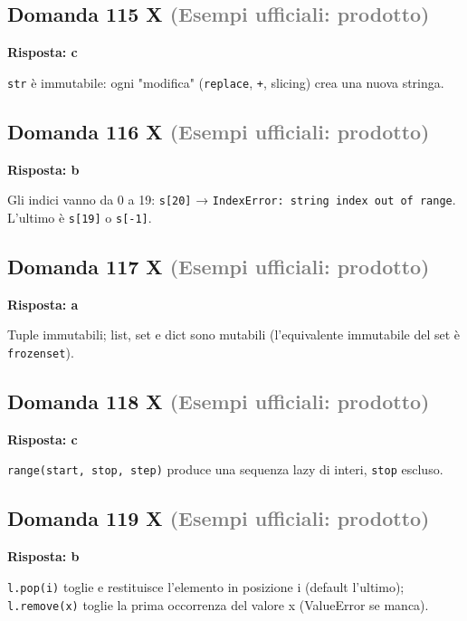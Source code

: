 \documentclass[a4paper,11pt]{article}
\begin{document}
\subsection*{Domanda 115 X \hfill {\small \textcolor{gray}{(Esempi ufficiali: prodotto)}}}
\textbf{Risposta: c}\par
\texttt{str} è immutabile: ogni "modifica" (\texttt{replace}, \texttt{+}, slicing) crea una nuova stringa.



\subsection*{Domanda 116 X \hfill {\small \textcolor{gray}{(Esempi ufficiali: prodotto)}}}
\textbf{Risposta: b}\par
Gli indici vanno da 0 a 19: \texttt{s[20]} → \texttt{IndexError: string index out of range}. L'ultimo è \texttt{s[19]} o \texttt{s[-1]}.



\subsection*{Domanda 117 X \hfill {\small \textcolor{gray}{(Esempi ufficiali: prodotto)}}}
\textbf{Risposta: a}\par
Tuple immutabili; list, set e dict sono mutabili (l'equivalente immutabile del set è \texttt{frozenset}).



\subsection*{Domanda 118 X \hfill {\small \textcolor{gray}{(Esempi ufficiali: prodotto)}}}
\textbf{Risposta: c}\par
\texttt{range(start, stop, step)} produce una sequenza lazy di interi, \texttt{stop} escluso.



\subsection*{Domanda 119 X \hfill {\small \textcolor{gray}{(Esempi ufficiali: prodotto)}}}
\textbf{Risposta: b}\par
\texttt{l.pop(i)} toglie e restituisce l'elemento in posizione i (default l'ultimo); \texttt{l.remove(x)} toglie la prima occorrenza del valore x (ValueError se manca).
\end{document}
